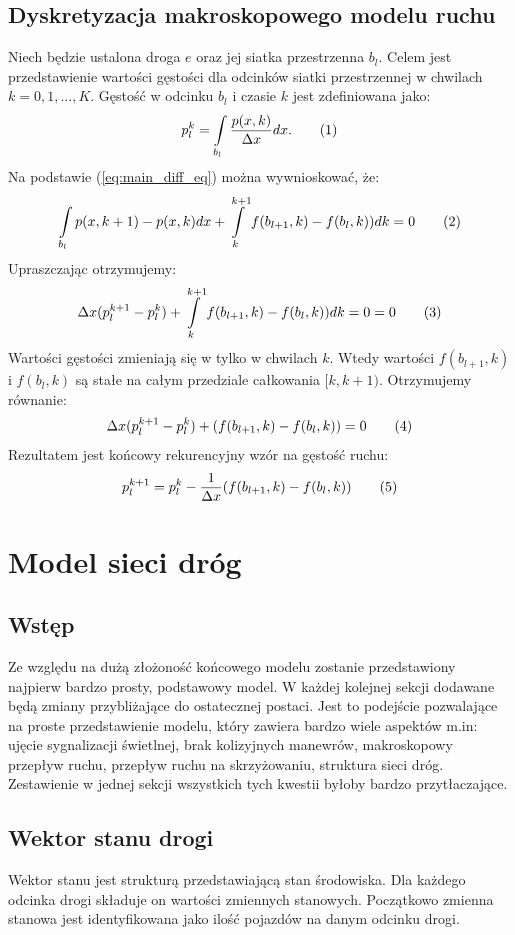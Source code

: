 \documentclass[12pt]{book}
\theoremstyle{plain}
\newcommand\addtag{\refstepcounter{equation}
\renewcommand{\labelenumii}{\theenumii}
\renewcommand{\theenumii}{\theenumi.\arabic{enumii}.}
\tag{\theequation}}
\begin{document}
\section{Dyskretyzacja makroskopowego modelu ruchu}
Niech będzie ustalona droga $e$ oraz jej siatka przestrzenna $b_l$. Celem jest przedstawienie wartości gęstości dla odcinków siatki przestrzennej w chwilach $k=0,1,...,K$.
Gęstość w odcinku $b_l$ i czasie $k$ jest zdefiniowana jako:
\[p_{l}^{k}=\int\limits_{{b_{l}}}{\frac{p(x,k)}{\Delta x}dx}. \addtag\]
Na podstawie (\ref{eq:main_diff_eq}) można wywnioskować, że:
\[\int\limits_{b_{l}} {p(x,k+1)- p(x,k)dx} +\int\limits_{k}^{k+1} f(b_{l+1},k)-f(b_{l},k))dk=0 \addtag \label{eq:calki-LWR} \]
Upraszczając otrzymujemy:
\[\Delta x(p_l^{k+1}-p_l^{k}) +\int\limits_{k}^{k+1} f(b_{l+1},k)-f(b_{l},k))dk=0=0 \addtag \]
Wartości gęstości zmieniają się w tylko w chwilach $k$. Wtedy wartości $f(b_{l+1},k)$ i $f(b_l,k)$ są stałe na całym przedziale całkowania $[k,k+1)$. Otrzymujemy równanie:
\[\Delta x(p_l^{k+1}-p_l^{k})  + (f(b_{l+1},k)-f(b_l,k))=0 \addtag \]
Rezultatem jest końcowy rekurencyjny wzór na gęstość ruchu:
\[p_l^{k+1}=p_l^{k}  -\frac{1}{\Delta x}  (f(b_{l+1},k)-f(b_l,k)) \addtag \]


\chapter{Model sieci dróg}
\section{Wstęp}
Ze względu na dużą złożoność końcowego modelu zostanie przedstawiony najpierw bardzo prosty, podstawowy model. W każdej kolejnej sekcji dodawane będą zmiany przybliżające do ostatecznej postaci. Jest to podejście pozwalające na proste przedstawienie modelu, który zawiera bardzo wiele aspektów m.in:
ujęcie sygnalizacji świetlnej, brak kolizyjnych manewrów, makroskopowy przepływ ruchu, przepływ ruchu na skrzyżowaniu, struktura sieci dróg. Zestawienie w jednej sekcji wszystkich tych kwestii byłoby bardzo przytłaczające.

\section{Wektor stanu drogi} \label{sec:wektor_stanu_drogi}
Wektor stanu jest strukturą przedstawiającą stan środowiska. Dla każdego odcinka drogi składuje on wartości zmiennych stanowych. Początkowo zmienna stanowa jest identyfikowana jako ilość pojazdów na danym odcinku drogi. 
\end{document}
